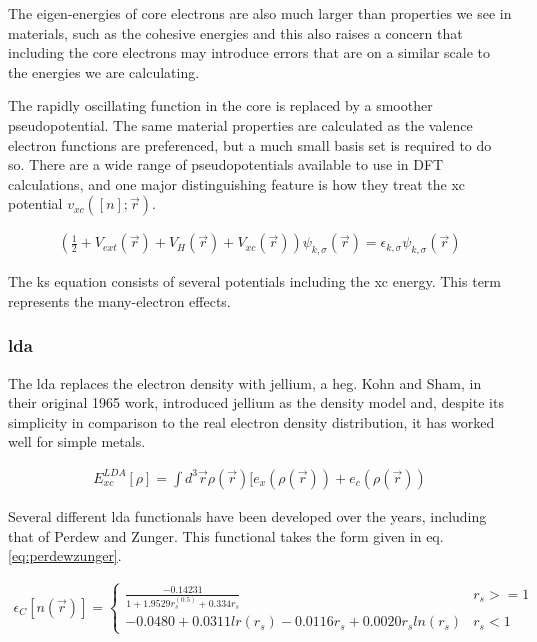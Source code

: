The eigen-energies of core electrons are also much larger than properties we see in materials, such as the cohesive energies and this also raises a concern that including the core electrons may introduce errors that are on a similar scale to the energies we are calculating.

The rapidly oscillating function in the core is replaced by a smoother pseudopotential.  The same material properties are calculated as the valence electron functions are preferenced, but a much small basis set is required to do so.  There are a wide range of pseudopotentials available to use in DFT calculations, and one major distinguishing feature is how they treat the \acrshort{xc} potential $v_{xc} ([n]; \vec{r})$.  

\begin{equation}
\begin{split}
\left(\frac{1}{2} + V_{ext}(\vec{r}) + V_{H}(\vec{r}) + V_{xc}(\vec{r})\right) \psi_{k,\sigma}(\vec{r}) = \epsilon_{k, \sigma} \psi_{k,\sigma}(\vec{r})
\end{split}
\label{eq:Fermi-Dirac distribution}
\end{equation}

The \acrshort{ks} equation consists of several potentials including the \acrlong{xc} energy.  This term represents the many-electron effects. 

\subsubsection{\acrshort{lda}}

The \acrlong{lda} replaces the electron density with \gls{jellium}, a \gls{heg}.  Kohn and Sham, in their original 1965 work, introduced jellium as the density model and, despite its simplicity in comparison to the real electron density distribution, it has worked well for simple metals.

\begin{equation}
\begin{split}
E_{xc}^{LDA}[\rho] = \int d^3\vec{r} \rho(\vec{r})[e_x (\rho(\vec{r})) + e_c (\rho(\vec{r}))
\end{split}
\label{eq:lda}
\end{equation}

Several different \acrshort{lda} functionals have been developed over the years, including that of Perdew and Zunger.  This functional takes the form given in eq. \ref{eq:perdewzunger}\cite{dftgupta1}.

\begin{equation}
\begin{split}
\epsilon_{C} [n(\vec{r})] = \left\{ \begin{matrix} \frac{-0.14231}{1+1.9529 r_s^(0.5) + 0.334 r_s}  & r_s >= 1  \\ -0.0480+0.0311 lr(r_s) - 0.0116 r_s + 0.0020 r_s ln(r_s)  & r_s < 1 \end{matrix} \right . 
\end{split}
\label{eq:perdewzunger}
\end{equation}

